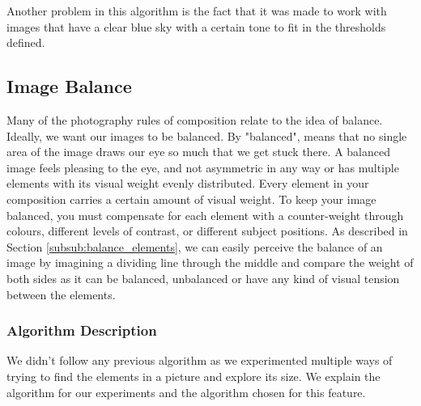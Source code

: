 Another problem in this algorithm is the fact that it was made to work with images that have a clear blue sky with a certain tone to fit in the thresholds defined.

\subsection{Image Balance}
\label{sub:balance}
Many of the photography rules of composition relate to the idea of balance. Ideally, we want our images to be balanced. By "balanced", means that no single area of the image draws our eye so much that we get stuck there. A balanced image feels pleasing to the eye, and not asymmetric in any way or has multiple elements with its visual weight evenly distributed. Every element in your composition carries a certain amount of visual weight. To keep your image balanced, you must compensate for each element with a counter-weight through colours, different levels of contrast, or different subject positions. As described in Section \ref{subsub:balance_elements}, we can easily perceive the balance of an image by imagining a dividing line through the middle and compare the weight of both sides as it can be balanced, unbalanced or have any kind of visual tension between the elements.

\subsubsection{Algorithm Description}

We didn't follow any previous algorithm as we experimented multiple ways of trying to find the elements in a picture and explore its size. We explain the algorithm for our experiments and the algorithm chosen for this feature.

